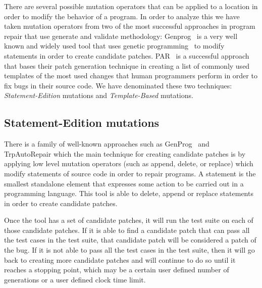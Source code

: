 \documentclass[conference]{IEEEtran}
\begin{document}
There are several possible mutation operators that can be applied to a location 
in order to modify the behavior of a program. In order to analyze this we have 
taken mutation operators from two of the most successful approaches in program 
repair that use generate and validate methodology: Genprog~\cite{legoues12} is a very well known and widely used tool that uses genetic programming~\cite{koza92} to modify 
statements in order to create candidate patches. PAR~\cite{kim2013} is a 
successful approach that bases their patch generation technique in creating a 
list of commonly used templates of the most used changes that human programmers 
perform in order to fix bugs in their source code. We have denominated these two 
techniques: \textit{Statement-Edition} mutations 
and \textit{Template-Based} mutations.



\subsection{Statement-Edition mutations}
There is a family of well-known approaches such as GenProg~\cite{legoues12} and 
TrpAutoRepair\cite{Qi13} which the main technique for creating candidate 
patches is by applying low level mutation operators (such as append, delete, or 
replace) which modify statements of source code in order to 
repair programs. A statement is the smallest standalone element that expresses 
some action to be carried out in a programming language. This tool is able to 
delete, append or replace statements in order to create candidate patches.

Once the tool has a set of candidate patches, it will run the test suite on each 
of those candidate patches. If it is able to find a candidate patch that can 
pass all the test cases in the test suite, that candidate patch will be 
considered a patch of the bug. If it is not able to pass all the test cases in 
the test suite, then it will go back to creating more candidate patches and will 
continue to do so until it reaches a stopping point, which may be a certain user 
defined number of generations or a user defined clock time limit.
\end{document}

